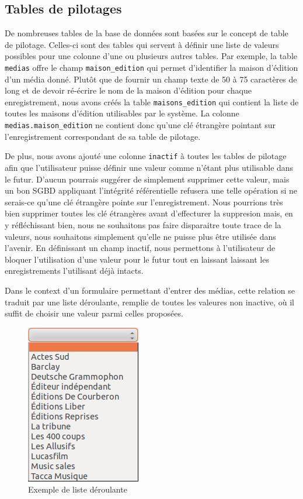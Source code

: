 \documentclass[letter, 11pt]{report}
\begin{document}
\subsection{Tables de pilotages}
De nombreuses tables de la base de données sont basées sur le concept de table de pilotage. Celles-ci sont des tables qui servent à définir une liste de valeurs possibles pour une colonne d'une ou plusieurs autres tables. Par exemple, la table \texttt{medias} offre le champ \texttt{maison\_edition} qui permet d'identifier la maison d'édition d'un média donné. Plutôt que de fournir un champ texte de 50 à 75 caractères de long et de devoir ré-écrire le nom de la maison d'édition pour chaque enregistrement, nous avons créés la table \texttt{maisons\_edition} qui contient la liste de toutes les maisons d'édition utilisables par le système. La colonne \texttt{medias.maison\_edition} ne contient donc qu'une clé étrangère pointant sur l'enregistrement correspondant de sa table de pilotage.

De plus, nous avons ajouté une colonne \texttt{inactif} à toutes les tables de pilotage afin que l'utilisateur puisse définir une valeur comme n'étant plus utilisable dans le futur. D'aucun pourrais suggérer de simplement supprimer cette valeur, mais un bon \ac{SGBD} appliquant l'intégrité référentielle refusera une telle opération si ne serais-ce qu'une clé étrangère pointe sur l'enregistrement. Nous pourrions très bien supprimer toutes les clé étrangères avant d'effecturer la suppresion mais, en y réfléchissant bien, nous ne souhaitons pas faire disparaitre toute trace de la valeurs, nous souhaitons simplement qu'elle ne puisse plus être utilisée dans l'avenir. En définissant un champ inactif, nous permettons à l'utilisateur de bloquer l'utilisation d'une valeur pour le futur tout en laissant laissant les enregistrements l'utilisant déjà intacts.

Dans le context d'un formulaire permettant d'entrer des médias, cette relation se traduit par une liste déroulante, remplie de toutes les valeures non inactive, où il suffit de choisir une valeur parmi celles proposées.

\begin{figure}[htbp]
	\begin{center}
		\includegraphics[scale=0.5]{exempleListeDeroulante.png}
	\end{center}
	\caption{Exemple de liste déroulante}
\end{figure}
\end{document}

